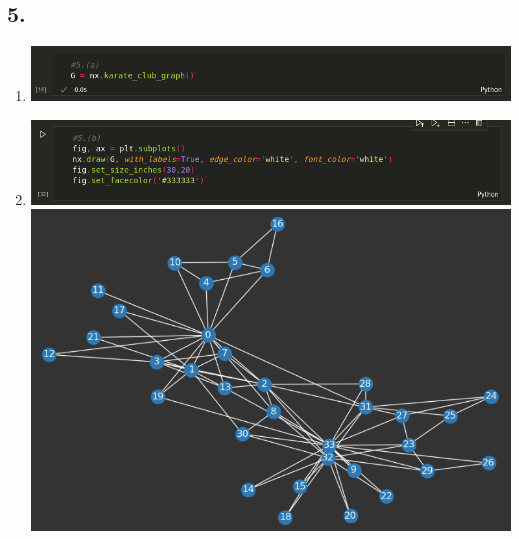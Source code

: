 \documentclass{article}
\begin{document}
    \subsection*{5.}
    \vspace*{10pt}
    \begin{enumerate}[label=(\alph*), left=10pt, itemsep=10pt]
        \item \begin{minipage}[t]{0.9\textwidth}
                \begin{minipage}[t]{0.9\textwidth}
                    \vspace{0.1em} %
                    \centering
                    \includegraphics[width=5.9in]{./5a.png} 
                \end{minipage}
        \end{minipage}
        \item \begin{minipage}[t]{0.9\textwidth}
            \begin{minipage}[t]{0.9\textwidth}
                \vspace{0.1em} %
                \centering
                \includegraphics[width=5.9in]{./5bi.png}
                \includegraphics[width=5.9in]{./5bii.png}

\end{minipage}
\end{minipage}
\end{enumerate}
\end{document}

